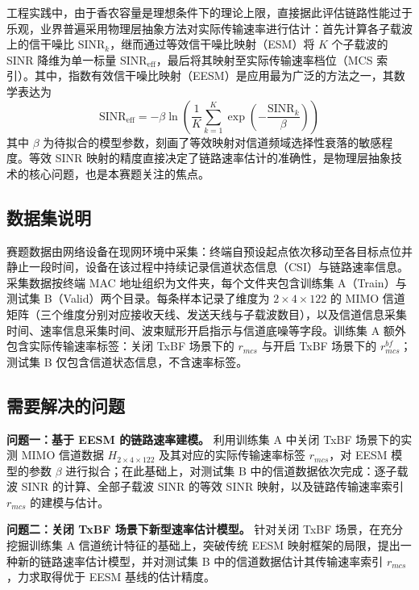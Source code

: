 \documentclass[bwprint]{gmcmthesis}
\numberwithin{figure}{section}
\begin{document}
工程实践中，由于香农容量是理想条件下的理论上限，直接据此评估链路性能过于乐观，业界普遍采用物理层抽象方法对实际传输速率进行估计：首先计算各子载波上的信干噪比 $\mathrm{SINR}_k$，继而通过等效信干噪比映射（ESM）将 $K$ 个子载波的 SINR 降维为单一标量 $\mathrm{SINR}_{\mathrm{eff}}$，最后将其映射至实际传输速率档位（MCS 索引）。其中，指数有效信干噪比映射（EESM）是应用最为广泛的方法之一，其数学表达为
\begin{equation}
	\mathrm{SINR}_{\mathrm{eff}} = -\beta \ln\left( \frac{1}{K} \sum_{k=1}^{K} \exp\left( -\frac{\mathrm{SINR}_k}{\beta} \right) \right) \label{eq:eesm}
\end{equation}
其中 $\beta$ 为待拟合的模型参数，刻画了等效映射对信道频域选择性衰落的敏感程度。等效 SINR 映射的精度直接决定了链路速率估计的准确性，是物理层抽象技术的核心问题，也是本赛题关注的焦点。

\subsection{数据集说明}

赛题数据由网络设备在现网环境中采集：终端自预设起点依次移动至各目标点位并静止一段时间，设备在该过程中持续记录信道状态信息（CSI）与链路速率信息。采集数据按终端 MAC 地址组织为文件夹，每个文件夹包含训练集 A（Train）与测试集 B（Valid）两个目录。每条样本记录了维度为 $2\times4\times122$ 的 MIMO 信道矩阵（三个维度分别对应接收天线、发送天线与子载波数目），以及信道信息采集时间、速率信息采集时间、波束赋形开启指示与信道底噪等字段。训练集 A 额外包含实际传输速率标签：关闭 TxBF 场景下的 $r_{mcs}$ 与开启 TxBF 场景下的 $r_{mcs}^{bf}$；测试集 B 仅包含信道状态信息，不含速率标签。

\subsection{需要解决的问题}

\textbf{问题一：基于 EESM 的链路速率建模。}
利用训练集 A 中关闭 TxBF 场景下的实测 MIMO 信道数据 $H_{2\times4\times122}$ 及其对应的实际传输速率标签 $r_{mcs}$，对 EESM 模型的参数 $\beta$ 进行拟合；在此基础上，对测试集 B 中的信道数据依次完成：逐子载波 SINR 的计算、全部子载波 SINR 的等效 SINR 映射，以及链路传输速率索引 $r_{mcs}$ 的建模与估计。

\textbf{问题二：关闭 TxBF 场景下新型速率估计模型。}
针对关闭 TxBF 场景，在充分挖掘训练集 A 信道统计特征的基础上，突破传统 EESM 映射框架的局限，提出一种新的链路速率估计模型，并对测试集 B 中的信道数据估计其传输速率索引 $r_{mcs}$，力求取得优于 EESM 基线的估计精度。
\end{document}
